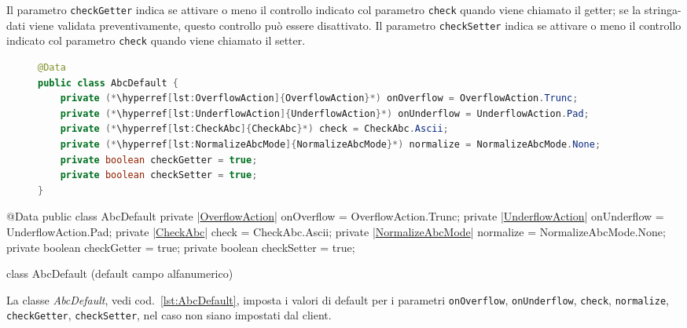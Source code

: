 Il parametro \hypertarget{abc:get}{\texttt{checkGetter}} indica se attivare o 
meno il controllo indicato col parametro \verb!check! quando viene chiamato il 
getter; se la stringa-dati viene validata preventivamente, questo controllo può 
essere disattivato.
Il parametro \hypertarget{abc:set}{\texttt{checkSetter}} indica se attivare o 
meno il controllo indicato col parametro \verb!check! quando viene chiamato il 
setter.

\ifesource
\begin{figure*}[!htb]
\begin{lstlisting}[language=java, 
caption=class AbcDefault (default campo alfanumerico), 
label=lst:AbcDefault]
@Data
public class AbcDefault {
    private (*\hyperref[lst:OverflowAction]{OverflowAction}*) onOverflow = OverflowAction.Trunc;
    private (*\hyperref[lst:UnderflowAction]{UnderflowAction}*) onUnderflow = UnderflowAction.Pad;
    private (*\hyperref[lst:CheckAbc]{CheckAbc}*) check = CheckAbc.Ascii;
    private (*\hyperref[lst:NormalizeAbcMode]{NormalizeAbcMode}*) normalize = NormalizeAbcMode.None;
    private boolean checkGetter = true;
    private boolean checkSetter = true;
}
\end{lstlisting}
\end{figure*}
\else
\begin{elisting}[!htb]
\begin{javacode}
@Data
public class AbcDefault {
    private |\hyperref[lst:OverflowAction]{OverflowAction}| onOverflow = OverflowAction.Trunc;
    private |\hyperref[lst:UnderflowAction]{UnderflowAction}| onUnderflow = UnderflowAction.Pad;
    private |\hyperref[lst:CheckAbc]{CheckAbc}| check = CheckAbc.Ascii;
    private |\hyperref[lst:NormalizeAbcMode]{NormalizeAbcMode}| normalize = NormalizeAbcMode.None;
    private boolean checkGetter = true;
    private boolean checkSetter = true;
}
\end{javacode}
\caption{class AbcDefault (default campo alfanumerico)}
\label{lst:AbcDefault}
\end{elisting}
\fi

La classe \textsl{AbcDefault}, vedi cod.~\ref{lst:AbcDefault}, imposta i valori
di default per i parametri \verb!onOverflow!, \verb!onUnderflow!, \verb!check!, 
\verb!normalize!, \verb!checkGetter!, \verb!checkSetter!, nel caso non siano 
impostati dal client.

